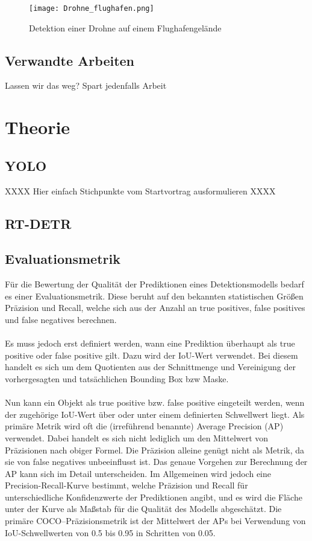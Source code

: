 \documentclass[runningheads]{llncs}
\begin{document}
\begin{figure}
    \centering
    \texttt{[image: Drohne\_flughafen.png]}
    \caption{Detektion einer Drohne auf einem Flughafengelände}
\end{figure}
\FloatBarrier

\subsection{Verwandte Arbeiten}

Lassen wir das weg? Spart jedenfalls Arbeit

\section{Theorie}

\subsection{YOLO}

XXXX Hier einfach Stichpunkte vom Startvortrag ausformulieren XXXX

\subsection{RT-DETR}

\subsection{Evaluationsmetrik}
Für die Bewertung der Qualität der Prediktionen eines Detektionsmodells bedarf es einer Evaluationsmetrik. Diese beruht auf den bekannten statistischen Größen Präzision und Recall, welche sich aus der Anzahl an true positives, false positives und false negatives berechnen.\\\\
Es muss jedoch erst definiert werden, wann eine Prediktion überhaupt als true positive oder false positive gilt. Dazu wird der IoU-Wert verwendet. Bei diesem handelt es sich um dem Quotienten aus der Schnittmenge und Vereinigung der vorhergesagten und tatsächlichen Bounding Box bzw Maske.\\\\
Nun kann ein Objekt als true positive bzw. false positive eingeteilt werden, wenn der zugehörige IoU-Wert über oder unter einem definierten Schwellwert liegt. Als primäre Metrik wird oft die (irreführend benannte) Average Precision (AP) verwendet. Dabei handelt es sich nicht lediglich um den Mittelwert von Präzisionen nach obiger Formel. Die Präzision alleine genügt nicht als Metrik, da sie von false negatives unbeeinflusst ist. Das genaue Vorgehen zur Berechnung der AP kann sich im Detail unterscheiden. Im Allgemeinen wird jedoch eine Precision-Recall-Kurve bestimmt, welche Präzision und Recall für unterschiedliche Konfidenzwerte der Prediktionen angibt, und  es wird die Fläche unter der Kurve als Maßstab für die Qualität des Modells abgeschätzt.\cite{Metriken} Die primäre COCO--Präzisionsmetrik ist der Mittelwert der APs bei Verwendung von IoU-Schwellwerten von 0.5 bis 0.95 in Schritten von 0.05.\cite{COCO-Metrik}
\end{document}
